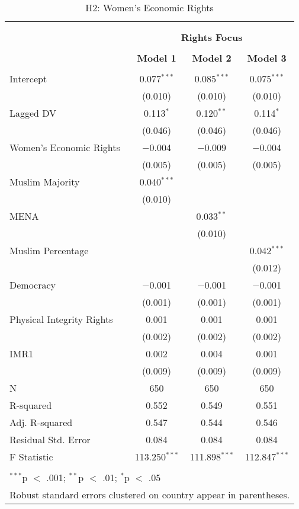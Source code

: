 
\begin{table}[!htbp] \centering 
  \caption{H2: Women's Economic Rights} 
  \label{} 
\begin{tabular}{@{\extracolsep{5pt}}lccc} 
\\[-1.8ex]\hline \\[-1.8ex] 
\\[-1.8ex] & \multicolumn{3}{c}{\textbf{Rights Focus}} \\ 
\\[-1.8ex] & \textbf{Model 1} & \textbf{Model 2} & \textbf{Model 3}\\ 
\hline \\[-1.8ex] 
 Intercept & 0.077$^{***}$ & 0.085$^{***}$ & 0.075$^{***}$ \\ 
  & (0.010) & (0.010) & (0.010) \\ 
  Lagged DV & 0.113$^{*}$ & 0.120$^{**}$ & 0.114$^{*}$ \\ 
  & (0.046) & (0.046) & (0.046) \\ 
  Women's Economic Rights & $-$0.004 & $-$0.009 & $-$0.004 \\ 
  & (0.005) & (0.005) & (0.005) \\ 
  Muslim Majority & 0.040$^{***}$ &  &  \\ 
  & (0.010) &  &  \\ 
  MENA &  & 0.033$^{**}$ &  \\ 
  &  & (0.010) &  \\ 
  Muslim Percentage &  &  & 0.042$^{***}$ \\ 
  &  &  & (0.012) \\ 
  Democracy & $-$0.001 & $-$0.001 & $-$0.001 \\ 
  & (0.001) & (0.001) & (0.001) \\ 
  Physical Integrity Rights & 0.001 & 0.001 & 0.001 \\ 
  & (0.002) & (0.002) & (0.002) \\ 
  IMR1 & 0.002 & 0.004 & 0.001 \\ 
  & (0.009) & (0.009) & (0.009) \\ 
 N & 650 & 650 & 650 \\ 
R-squared & 0.552 & 0.549 & 0.551 \\ 
Adj. R-squared & 0.547 & 0.544 & 0.546 \\ 
Residual Std. Error & 0.084 & 0.084 & 0.084 \\ 
F Statistic & 113.250$^{***}$ & 111.898$^{***}$ & 112.847$^{***}$ \\ 
\hline \\[-1.8ex] 
\multicolumn{4}{l}{$^{***}$p $<$ .001; $^{**}$p $<$ .01; $^{*}$p $<$ .05} \\ 
\multicolumn{4}{l}{Robust standard errors clustered on country appear in parentheses.} \\ 
\end{tabular} 
\end{table} 
